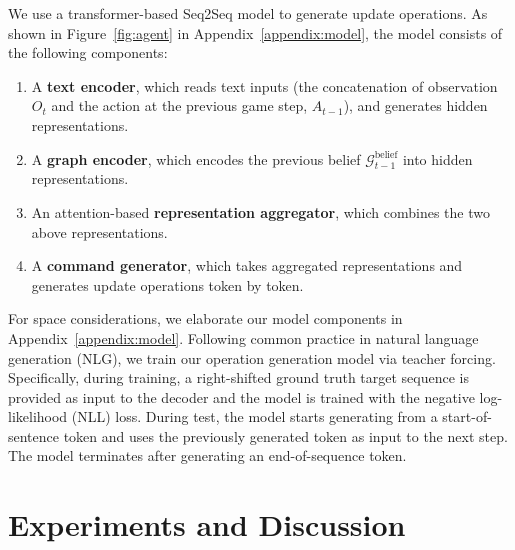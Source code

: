 \documentclass{article}
\begin{document}
We use a transformer-based Seq2Seq model \citep{vaswani17allyouneed} to generate update operations. 
As shown in Figure~\ref{fig:agent} in Appendix~\ref{appendix:model}, the model consists of the following components: 
\begin{enumerate}
    \item A \textbf{text encoder}, which reads text inputs (the concatenation of observation $O_t$ and the action at the previous game step, $A_{t-1}$), and generates hidden representations.
    \item A \textbf{graph encoder}, which encodes the previous belief $\mathcal{G}^\text{belief}_{t-1}$ into hidden representations.
    \item An attention-based \textbf{representation aggregator}, which combines the two above representations. 
    \item A \textbf{command generator}, which takes aggregated representations and generates update operations token by token.
\end{enumerate}


For space considerations, we elaborate our model components in Appendix~\ref{appendix:model}.
Following common practice in natural language generation (NLG), we train our operation generation model via teacher forcing.
Specifically, during training, a right-shifted ground truth target sequence is provided as input to the decoder and the model is trained with the negative log-likelihood (NLL) loss.
During test, the model starts generating from a start-of-sentence token and uses the previously generated token as input to the next step. The model terminates after generating an end-of-sequence token.

\section{Experiments and Discussion}
\label{section:exp}
\end{document}

